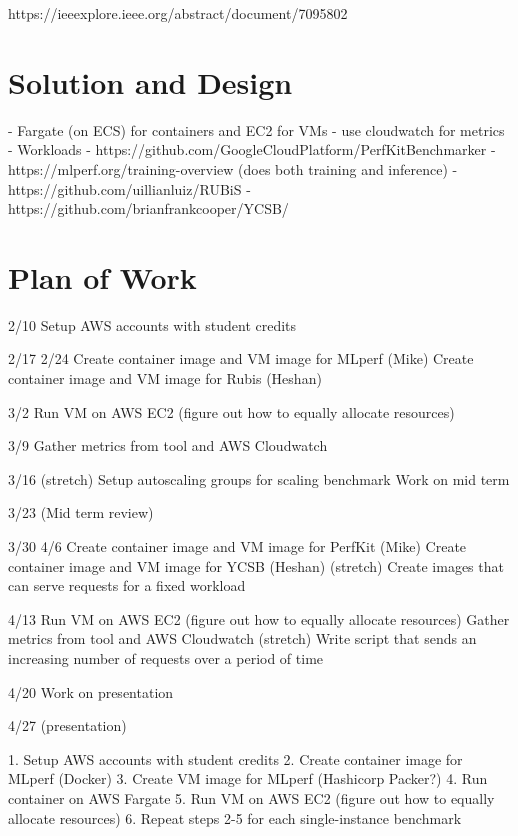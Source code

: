 \documentclass[11pt]{article}
\begin{document}
https://ieeexplore.ieee.org/abstract/document/7095802

\section{Solution and Design}

- Fargate (on ECS) for containers and EC2 for VMs
- use cloudwatch for metrics
- Workloads
  - https://github.com/GoogleCloudPlatform/PerfKitBenchmarker
  - https://mlperf.org/training-overview (does both training and inference)
  - https://github.com/uillianluiz/RUBiS
  - https://github.com/brianfrankcooper/YCSB/


\section{Plan of Work}


2/10
Setup AWS accounts with student credits

2/17
2/24
Create container image and VM image for MLperf (Mike)
Create container image and VM image for Rubis (Heshan)

3/2
Run VM on AWS EC2 (figure out how to equally allocate resources)

3/9
Gather metrics from tool and AWS Cloudwatch

3/16
(stretch) Setup autoscaling groups for scaling benchmark
Work on mid term

3/23 (Mid term review)

3/30
4/6
Create container image and VM image for PerfKit (Mike)
Create container image and VM image for YCSB (Heshan)
(stretch) Create images that can serve requests for a fixed workload

4/13
Run VM on AWS EC2 (figure out how to equally allocate resources)
Gather metrics from tool and AWS Cloudwatch
(stretch) Write script that sends an increasing number of requests over a period of time

4/20
Work on presentation

4/27 (presentation)

1. Setup AWS accounts with student credits
2. Create container image for MLperf (Docker)
3. Create VM image for MLperf (Hashicorp Packer?)
4. Run container on AWS Fargate
5. Run VM on AWS EC2 (figure out how to equally allocate resources)
6. Repeat steps 2-5 for each single-instance benchmark
\end{document}
